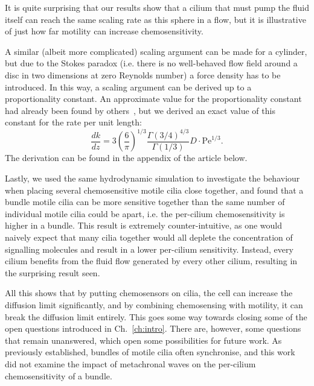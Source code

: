\begin{kaobox}[title=Reaction rate for a sphere]
    It is quite surprising that our results show that a cilium that must pump the fluid itself can reach the same scaling rate as this sphere in a flow, but it is illustrative of just how far motility can increase chemosensitivity.
    
    A similar (albeit more complicated) scaling argument can be made for a cylinder, but due to the Stokes paradox (i.e. there is no well-behaved flow field around a disc in two dimensions at zero Reynolds number) a force density has to be introduced. In this way, a scaling argument can be derived up to a proportionality constant. An approximate value for the proportionality constant had already been found by others~\cite{friedlander_mass_1957}, but we derived an exact value of this constant for the rate per unit length:
    \begin{equation*}
        \frac{dk}{dz} = 3\left(\frac{6}{\pi}\right)^{1/3} \frac{\Gamma(3/4)^{4/3}}{\Gamma(1/3)} D \cdot \mathrm{Pe}^{1/3}.
    \end{equation*}
    The derivation can be found in the appendix of the article below.
\end{kaobox}

Lastly, we used the same hydrodynamic simulation to investigate the behaviour when placing several chemosensitive motile cilia close together, and found that a bundle motile cilia can be more sensitive together than the same number of individual motile cilia could be apart, i.e. the per-cilium chemosensitivity is higher in a bundle. This result is extremely counter-intuitive, as one would naively expect that many cilia together would all deplete the concentration of signalling molecules and result in a lower per-cilium sensitivity. Instead, every cilium benefits from the fluid flow generated by every other cilium, resulting in the surprising result seen. 



All this shows that by putting chemosensors on cilia, the cell can increase the diffusion limit significantly, and by combining chemosensing with motility, it can break the diffusion limit entirely. This goes some way towards closing some of the open questions introduced in Ch.~\ref{ch:intro}. There are, however, some questions that remain unanswered, which open some possibilities for future work. As previously established, bundles of motile cilia often synchronise, and this work did not examine the impact of metachronal waves on the per-cilium chemosensitivity of a bundle.


